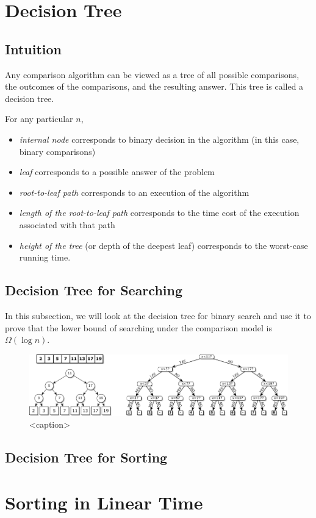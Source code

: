 \section{Decision Tree}

\subsection{Intuition}

Any comparison algorithm can be viewed as a tree of all possible comparisons, the outcomes of the comparisons, and the resulting answer. This tree is called a decision tree.

For any particular $n$,
\begin{itemize}
    \item \textit{internal node} corresponds to binary decision in the algorithm (in this case, binary comparisons)
    \item \textit{leaf} corresponds to a possible answer of the problem
    \item \textit{root-to-leaf path} corresponds to an execution of the algorithm
    \item \textit{length of the root-to-leaf path} corresponds to the time cost of the execution associated with that path
    \item \textit{height of the tree} (or depth of the deepest leaf) corresponds to the worst-case running time.
\end{itemize}

\subsection{Decision Tree for Searching}

In this subsection, we will look at the decision tree for binary search and use it to prove that the lower bound of searching under the comparison model is $\Omega(\log n)$.

\hfill

\begin{figure}[htbp]
    \centering
    \includegraphics[width=\linewidth]{figures/binary_search_decision_tree.pdf}
    \caption{<caption>}
\end{figure}

\subsection{Decision Tree for Sorting}

\section{Sorting in Linear Time}